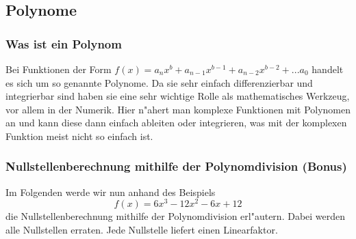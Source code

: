\subsection{Polynome}
\subsubsection{Was ist ein Polynom}
Bei Funktionen der Form $f(x) = a_n x^b + a_{n-1} x^{b-1} + a_{n-2} x^{b-2} + ... a_0$ handelt es sich um so genannte Polynome. Da sie sehr einfach differenzierbar und integrierbar sind haben sie eine sehr wichtige Rolle als mathematisches Werkzeug, vor allem in der Numerik. Hier n"ahert man komplexe Funktionen mit Polynomen an und kann diese dann einfach ableiten oder integrieren, was mit der komplexen Funktion meist nicht so einfach ist.

\subsubsection{Nullstellenberechnung mithilfe der Polynomdivision (Bonus)}
Im Folgenden werde wir nun anhand des Beispiels 
\begin{equation*}
f(x) = 6x^3 - 12x^2 - 6x + 12
\end{equation*}
die Nullstellenberechnung mithilfe der Polynomdivision erl"autern. Dabei werden alle Nullstellen erraten. Jede Nullstelle liefert einen Linearfaktor. 
